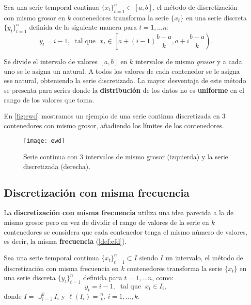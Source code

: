 \begin{definicion}
  Sea una serie temporal continua $\{x_t\}_{t = 1}^n \subset [a, b]$, el método de discretización con mismo grosor en $k$ contenedores transforma la serie $\{x_t\}$ en una serie discreta $\{y_t\}_{t = 1}^n$ definida de la siguiente manera para $t = 1, \ldots n$:
  $$y_t = i-1, \; \text{ tal que } \; x_t \in \left[a + (i-1) \dfrac{b - a}{k}, a + i \dfrac{b-a}{k}\right).$$
  \label{def:ewd}
\end{definicion}

Se divide el intervalo de valores $[a, b]$ en $k$ intervalos de mismo \emph{grosor} y a cada uno se le asigna un natural. A todos los valores de cada contenedor se le asigna ese natural, obteniendo la serie discretizada. La mayor desventaja de este método se presenta para series donde la \textbf{distribución} de los datos no es \textbf{uniforme} en el rango de los valores que toma.

En \autoref{fig:ewd} mostramos un ejemplo de una serie continua discretizada en 3 contenedores con mismo grosor, añadiendo los límites de los contenedores.

\begin{figure}[htpb]
  \centering
  \texttt{[image: ewd]}
  \caption{Serie continua con 3 intervalos de mismo grosor (izquierda) y la serie discretizada (derecha).}
  \label{fig:ewd}
\end{figure}

\subsection{Discretización con misma frecuencia}

La \textbf{discretización con misma frecuencia} utiliza una idea parecida a la de mismo grosor pero en vez de dividir el rango de valores de la serie en $k$ contenedores se considera que cada contenedor tenga el mismo número de valores, es decir, la misma \textbf{frecuencia} (\autoref{def:efd}).

\begin{definicion}
  Sea una serie temporal continua $\{x_t\}_{t = 1}^n \subset I$  siendo $I$ un intervalo, el método de discretización con misma frecuencia en $k$ contenedores transforma la serie $\{x_t\}$ en una serie discreta $\{y_t\}_{t = 1}^n$ definida para $t = 1, \ldots n$, como:
  $$y_t = i-1, \; \text{ tal que } \; x_t \in I_i,$$
  donde $I = \cup_{i = 1}^k I_i$ y $\ell(I_i) = \frac{n}{k}, \, i = 1, \ldots, k$.
  \label{def:efd}
\end{definicion}

